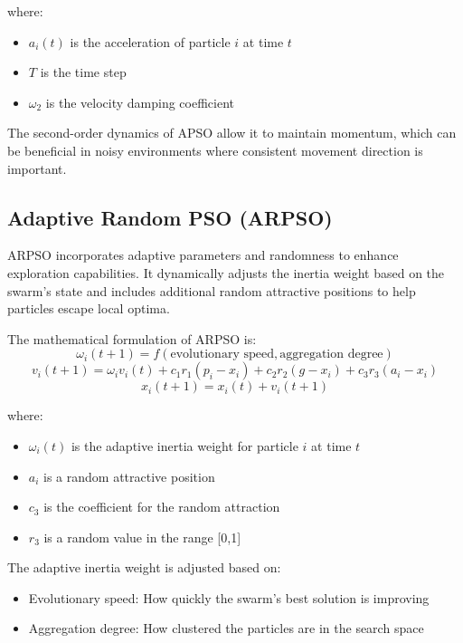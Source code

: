 \documentclass[conference]{IEEEtran}
\begin{document}
where:
\begin{itemize}
    \item $a_i(t)$ is the acceleration of particle $i$ at time $t$
    \item $T$ is the time step
    \item $\omega_2$ is the velocity damping coefficient
\end{itemize}

The second-order dynamics of APSO allow it to maintain momentum, which can be beneficial in noisy environments where consistent movement direction is important.

\subsection{Adaptive Random PSO (ARPSO)}
ARPSO incorporates adaptive parameters and randomness to enhance exploration capabilities. It dynamically adjusts the inertia weight based on the swarm's state and includes additional random attractive positions to help particles escape local optima.

The mathematical formulation of ARPSO is:
\begin{equation}
\omega_i(t+1) = f(\text{evolutionary speed}, \text{aggregation degree})
\end{equation}
\begin{equation}
v_i(t+1) = \omega_iv_i(t) + c_1r_1(p_i-x_i) + c_2r_2(g-x_i) + c_3r_3(a_i-x_i)
\end{equation}
\begin{equation}
x_i(t+1) = x_i(t) + v_i(t+1)
\end{equation}

where:
\begin{itemize}
    \item $\omega_i(t)$ is the adaptive inertia weight for particle $i$ at time $t$
    \item $a_i$ is a random attractive position
    \item $c_3$ is the coefficient for the random attraction
    \item $r_3$ is a random value in the range [0,1]
\end{itemize}

The adaptive inertia weight is adjusted based on:
\begin{itemize}
    \item Evolutionary speed: How quickly the swarm's best solution is improving
    \item Aggregation degree: How clustered the particles are in the search space
\end{itemize}
\end{document}
